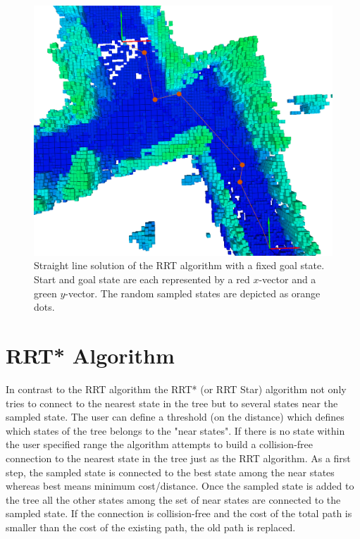 \begin{figure}[H]
   \centering
   \includegraphics[width=1\textwidth]{pics/smallGammaP.png}
   \caption{Straight line solution of the RRT algorithm with a fixed goal state. Start and goal state are each represented by a red $x$-vector and a green $y$-vector. The random sampled states are depicted as orange dots.}
   \label{pic:smallGamma}
\end{figure}



\section{RRT* Algorithm}\label{sec:RRTstar}

In contrast to the RRT algorithm the RRT* (or RRT Star) algorithm not only tries to connect to the nearest state in the tree but to several states near the sampled state. The user can define a threshold (on the distance) which defines which states of the tree belongs to the "near states". If there is no state within the user specified range the algorithm attempts to build a collision-free connection to the nearest state in the tree just as the RRT algorithm.  \newline
As a first step, the sampled state is connected to the best state among the near states whereas best means minimum cost/distance. Once the sampled state is added to the tree all the other states among the set of near states are connected to the sampled state. If the connection is collision-free and the cost of the total path is smaller than the cost of the existing path, the old path is replaced. \newline

